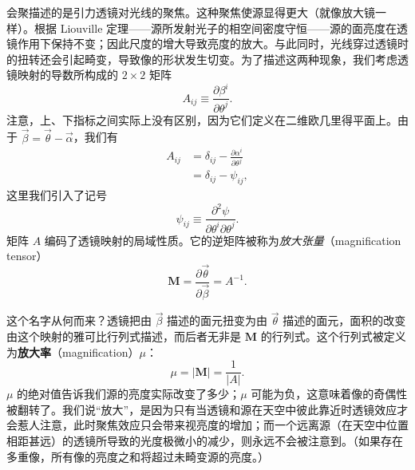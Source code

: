 会聚描述的是引力透镜对光线的聚焦。这种聚焦使源显得更大（就像放大镜一样）。根据 Liouville 定理——源所发射光子的相空间密度守恒——源的面亮度在透镜作用下保持不变；因此尺度的增大导致亮度的放大。与此同时，光线穿过透镜时的扭转还会引起畸变，导致像的形状发生切变。为了描述这两种现象，我们考虑透镜映射的导数所构成的 $2\times 2$ 矩阵
\begin{equation*}
A_{ij} \equiv \frac{\partial\beta^{i}}{\partial\theta^{j}}.
\tag{8.145}
\end{equation*}
注意，上、下指标之间实际上没有区别，因为它们定义在二维欧几里得平面上。由于 $\vec{\beta}=\vec{\theta}-\vec{\alpha}$，我们有
\begin{align*}
A_{ij} &= \delta_{ij} - \frac{\partial\alpha^{i}}{\partial\theta^{j}}\\
&= \delta_{ij} - \psi_{ij},
\tag{8.146}
\end{align*}
这里我们引入了记号
\begin{equation*}
\psi_{ij} \equiv \frac{\partial^{2}\psi}{\partial\theta^{i}\partial\theta^{j}}.
\tag{8.147}
\end{equation*}
矩阵 $A$ 编码了透镜映射的局域性质。它的逆矩阵被称为\emph{放大张量}（magnification tensor）
\begin{equation*}
\boldsymbol{M} = \frac{\partial\vec{\theta}}{\partial\vec{\beta}} = A^{-1}.
\tag{8.148}
\end{equation*}

这个名字从何而来？透镜把由 $\vec{\beta}$ 描述的面元扭变为由 $\vec{\theta}$ 描述的面元，面积的改变由这个映射的雅可比行列式描述，而后者无非是 $\boldsymbol{M}$ 的行列式。这个行列式被定义为\textbf{放大率}（magnification）$\mu$：
\begin{equation*}
\mu = |\boldsymbol{M}| = \frac{1}{|A|}.
\tag{8.149}
\end{equation*}
$\mu$ 的绝对值告诉我们源的亮度实际改变了多少；$\mu$ 可能为负，这意味着像的奇偶性被翻转了。我们说“放大”，是因为只有当透镜和源在天空中彼此靠近时透镜效应才会惹人注意，此时聚焦效应只会带来视亮度的增加；而一个远离源（在天空中位置相距甚远）的透镜所导致的光度极微小的减少，则永远不会被注意到。（如果存在多重像，所有像的亮度之和将超过未畸变源的亮度。）

